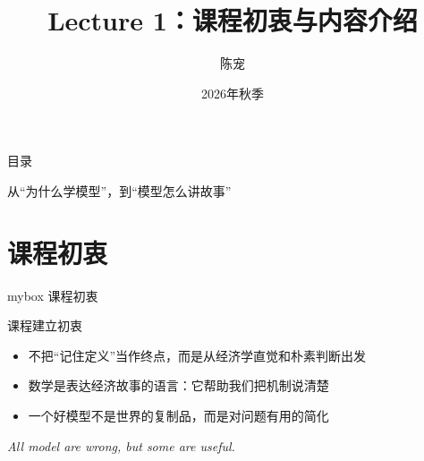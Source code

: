 \documentclass[aspectratio=32]{beamer}
\title[Lecture 1: 课程初衷与内容介绍]{Lecture 1：课程初衷与内容介绍}
\author{陈宠\inst{1}}
\institute{中国人民大学经济学院\inst{1}}
\date{2026年秋季}
\begin{document}
\begin{frame}
\maketitle
\end{frame}

\begin{frame}{目录}
\tableofcontents[hideallsubsections]
\vspace{0.35cm}
\begin{center}
\textcolor{LectureBlue}{从“为什么学模型”，到“模型怎么讲故事”}
\end{center}
\end{frame}

\section{课程初衷}
\begin{frame}
\begin{center}
    \begin{minipage}{1\textwidth}
		\begin{beamercolorbox}[wd=0.7\textwidth, rounded=true, shadow=true]{mybox}
			\LARGE \centering 课程初衷
		\end{beamercolorbox}
    \end{minipage}
\end{center} 
\end{frame}


\begin{frame}{课程建立初衷}
\vspace{0.15cm}
\begin{itemize}
    \item 不把“记住定义”当作终点，而是从经济学直觉和朴素判断出发
    \item 数学是表达经济故事的语言：它帮助我们把机制说清楚
    \item 一个好模型不是世界的复制品，而是对问题有用的简化
\end{itemize}
\vspace{0.25cm}
\begin{center}
\begin{center}
\large\textit{All model are wrong, but some are useful.}
\end{center}
\end{center}
\end{frame}
\end{document}
